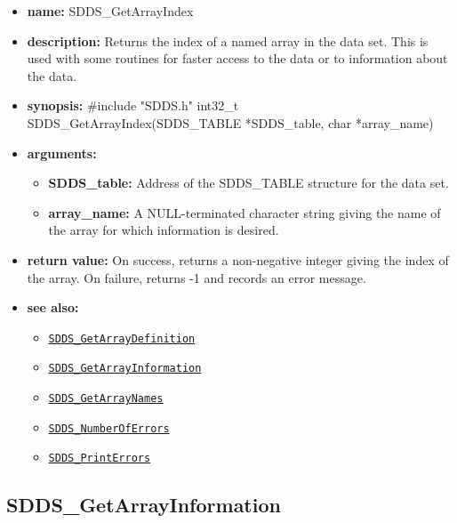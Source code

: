 \documentclass[11pt]{article}
\newcommand{\progref}[1]{\hyperref[SDDS_#1]{\tt SDDS\_#1}}
\begin{document}
\begin{itemize}
\item {\bf name:}\newline
SDDS\_GetArrayIndex
\item {\bf description:}\newline
Returns the index of a named array in the data set. This is used with some routines for faster access to the data or to information about the data.
\item {\bf synopsis:} \#include "SDDS.h"\newline
int32\_t SDDS\_GetArrayIndex(SDDS\_TABLE *SDDS\_table, char *array\_name)
\item {\bf arguments:}
\begin{itemize}
\item {\bf SDDS\_table:} Address of the SDDS\_TABLE structure for the data set.
\item {\bf array\_name:} A NULL-terminated character string giving the name of the array for which information is desired.
\end{itemize}
\item {\bf return value:}\newline
On success, returns a non-negative integer giving the index of the array. On failure, returns -1 and records an error message.
\item {\bf see also:}
\begin{itemize}
\item \progref{GetArrayDefinition}
\item \progref{GetArrayInformation}
\item \progref{GetArrayNames}
\item \progref{NumberOfErrors}
\item \progref{PrintErrors}
\end{itemize}
\end{itemize}

\subsection{SDDS\_GetArrayInformation}
\label{SDDS_GetArrayInformation}
\end{document}
